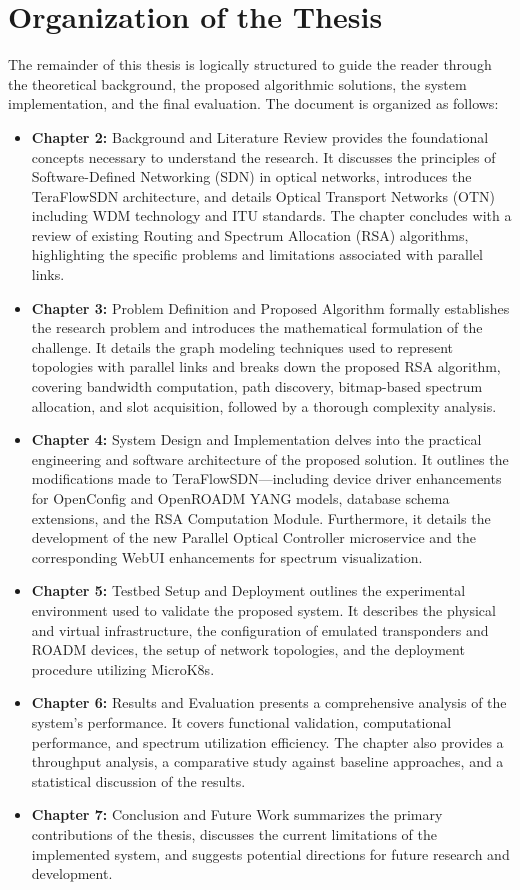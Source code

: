 \section{Organization of the Thesis}
The remainder of this thesis is logically structured to guide the reader through the theoretical background, the proposed algorithmic solutions, the system implementation, and the final evaluation. The document is organized as follows:
\begin{itemize}
    \item \textbf{Chapter 2:} Background and Literature Review provides the foundational concepts necessary to understand the research. It discusses the principles of Software-Defined Networking (SDN) in optical networks, introduces the TeraFlowSDN architecture, and details Optical Transport Networks (OTN) including WDM technology and ITU standards. The chapter concludes with a review of existing Routing and Spectrum Allocation (RSA) algorithms, highlighting the specific problems and limitations associated with parallel links.
    \item \textbf{Chapter 3:} Problem Definition and Proposed Algorithm formally establishes the research problem and introduces the mathematical formulation of the challenge. It details the graph modeling techniques used to represent topologies with parallel links and breaks down the proposed RSA algorithm, covering bandwidth computation, path discovery, bitmap-based spectrum allocation, and slot acquisition, followed by a thorough complexity analysis.
    \item \textbf{Chapter 4:} System Design and Implementation delves into the practical engineering and software architecture of the proposed solution. It outlines the modifications made to TeraFlowSDN—including device driver enhancements for OpenConfig and OpenROADM YANG models, database schema extensions, and the RSA Computation Module. Furthermore, it details the development of the new Parallel Optical Controller microservice and the corresponding WebUI enhancements for spectrum visualization.
    \item \textbf{Chapter 5:} Testbed Setup and Deployment outlines the experimental environment used to validate the proposed system. It describes the physical and virtual infrastructure, the configuration of emulated transponders and ROADM devices, the setup of network topologies, and the deployment procedure utilizing MicroK8s.
    \item \textbf{Chapter 6:} Results and Evaluation presents a comprehensive analysis of the system's performance. It covers functional validation, computational performance, and spectrum utilization efficiency. The chapter also provides a throughput analysis, a comparative study against baseline approaches, and a statistical discussion of the results.
    \item \textbf{Chapter 7:} Conclusion and Future Work summarizes the primary contributions of the thesis, discusses the current limitations of the implemented system, and suggests potential directions for future research and development.
\end{itemize}
